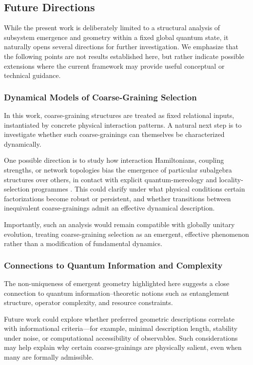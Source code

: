 \documentclass[12pt,a4paper,openany]{book}
\begin{document}
\subsection{Future Directions}

While the present work is deliberately limited to a structural analysis of subsystem emergence and geometry within a fixed global quantum state, it naturally opens several directions for further investigation. 
We emphasize that the following points are not results established here, but rather indicate possible extensions where the current framework may provide useful conceptual or technical guidance.

\subsubsection{Dynamical Models of Coarse-Graining Selection}

In this work, coarse-graining structures are treated as fixed relational inputs, instantiated by concrete physical interaction patterns. 
A natural next step is to investigate whether such coarse-grainings can themselves be characterized dynamically.

One possible direction is to study how interaction Hamiltonians, coupling strengths, or network topologies bias the emergence of particular subalgebra structures over others, in contact with explicit quantum-mereology and locality-selection programmes \cite{Cotler2019,CarrollSingh2021}.
This could clarify under what physical conditions certain factorizations become robust or persistent, and whether transitions between inequivalent coarse-grainings admit an effective dynamical description.

Importantly, such an analysis would remain compatible with globally unitary evolution, treating coarse-graining selection as an emergent, effective phenomenon rather than a modification of fundamental dynamics.

\subsubsection{Connections to Quantum Information and Complexity}

The non-uniqueness of emergent geometry highlighted here suggests a close connection to quantum information--theoretic notions such as entanglement structure, operator complexity, and resource constraints.

Future work could explore whether preferred geometric descriptions correlate with informational criteria---for example, minimal description length, stability under noise, or computational accessibility of observables. 
Such considerations may help explain why certain coarse-grainings are physically salient, even when many are formally admissible.
\end{document}

